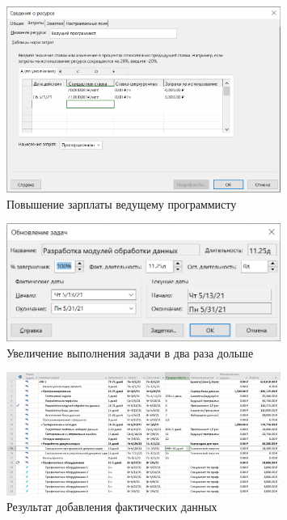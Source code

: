 \begin{figure}[H]
    \centering
    \includegraphics[width=0.8\textwidth]{img/content/task_10_1_2.png}
    \caption{Повышение зарплаты ведущему программисту}
    \label{fig:task_10_1_2}
\end{figure}

\begin{figure}[H]
    \centering
    \includegraphics[width=0.8\textwidth]{img/content/task_10_1_3.png}
    \caption{Увеличение выполнения задачи в два раза дольше}
    \label{fig:task_10_1_3}
\end{figure}

\begin{figure}[H]
    \centering
    \includegraphics[width=0.8\textwidth]{img/content/task_10_1_finish.png}
    \caption{Результат добавления фактических данных}
    \label{fig:task_10_1_finish}
\end{figure}

